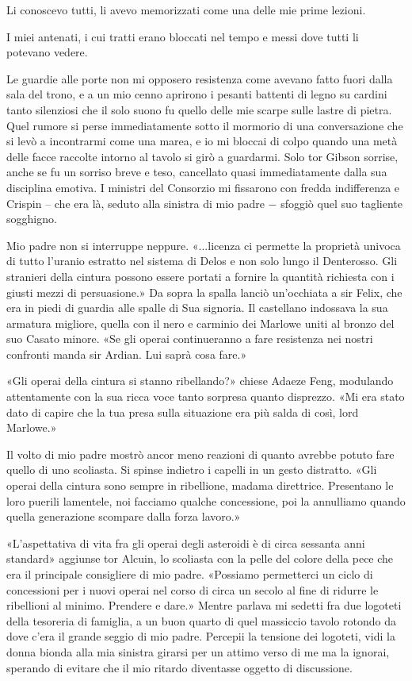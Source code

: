 Li conoscevo tutti, li avevo memorizzati come una delle mie prime
lezioni.

I miei antenati, i cui tratti erano bloccati nel tempo e messi dove
tutti li potevano vedere.

Le guardie alle porte non mi opposero resistenza come avevano fatto
fuori dalla sala del trono, e a un mio cenno aprirono i pesanti battenti
di legno su cardini tanto silenziosi che il solo suono fu quello delle
mie scarpe sulle lastre di pietra. Quel rumore si perse immediatamente
sotto il mormorio di una conversazione che si levò a incontrarmi come
una marea, e io mi bloccai di colpo quando una metà delle facce raccolte
intorno al tavolo si girò a guardarmi. Solo tor Gibson sorrise, anche se
fu un sorriso breve e teso, cancellato quasi immediatamente dalla sua
disciplina emotiva. I ministri del Consorzio mi fissarono con fredda
indifferenza e Crispin -- che era là, seduto alla sinistra di mio padre
− sfoggiò quel suo tagliente sogghigno.

Mio padre non si interruppe neppure. «...licenza ci permette la
proprietà univoca di tutto l'uranio estratto nel sistema di Delos e non
solo lungo il Denterosso. Gli stranieri della cintura possono essere
portati a fornire la quantità richiesta con i giusti mezzi di
persuasione.» Da sopra la spalla lanciò un'occhiata a sir Felix, che era
in piedi di guardia alle spalle di Sua signoria. Il castellano indossava
la sua armatura migliore, quella con il nero e carminio dei Marlowe
uniti al bronzo del suo Casato minore. «Se gli operai continueranno a
fare resistenza nei nostri confronti manda sir Ardian. Lui saprà cosa
fare.»

«Gli operai della cintura si stanno ribellando?» chiese Adaeze Feng,
modulando attentamente con la sua ricca voce tanto sorpresa quanto
disprezzo. «Mi era stato dato di capire che la tua presa sulla
situazione era più salda di così, lord Marlowe.»

Il volto di mio padre mostrò ancor meno reazioni di quanto avrebbe
potuto fare quello di uno scoliasta. Si spinse indietro i capelli in un
gesto distratto. «Gli operai della cintura sono sempre in ribellione,
madama direttrice. Presentano le loro puerili lamentele, noi facciamo
qualche concessione, poi la annulliamo quando quella generazione
scompare dalla forza lavoro.»

«L'aspettativa di vita fra gli operai degli asteroidi è di circa
sessanta anni standard» aggiunse tor Alcuin, lo scoliasta con la pelle
del colore della pece che era il principale consigliere di mio padre.
«Possiamo permetterci un ciclo di concessioni per i nuovi operai nel
corso di circa un secolo al fine di ridurre le ribellioni al minimo.
Prendere e dare.» Mentre parlava mi sedetti fra due logoteti della
tesoreria di famiglia, a un buon quarto di quel massiccio tavolo rotondo
da dove c'era il grande seggio di mio padre. Percepii la tensione dei
logoteti, vidi la donna bionda alla mia sinistra girarsi per un attimo
verso di me ma la ignorai, sperando di evitare che il mio ritardo
diventasse oggetto di discussione.

